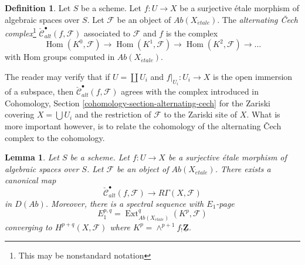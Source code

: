 \documentclass{stacks-project}
\theoremstyle{plain}
\newtheorem{lemma}[subsection]{Lemma}
\theoremstyle{definition}
\newtheorem{definition}[subsection]{Definition}
\theoremstyle{remark}
\numberwithin{equation}{subsection}
\def\Hom{\mathop{\mathrm{Hom}}\nolimits}
\def\Ext{\mathop{\mathrm{Ext}}\nolimits}
\def\etale{{\acute{e}tale}}
\begin{document}
\begin{definition}
\label{definition-alternating-cech-complex}
Let $S$ be a scheme. Let $f : U \to X$ be a surjective \'etale morphism
of algebraic spaces over $S$. Let $\mathcal{F}$ be an object of
$\textit{Ab}(X_\etale)$. The
{\it alternating {\v C}ech complex}\footnote{This may be nonstandard notation}
$\check{\mathcal{C}}^\bullet_{alt}(f, \mathcal{F})$
associated to $\mathcal{F}$ and $f$ is the complex
$$
\Hom(K^0, \mathcal{F}) \to \Hom(K^1, \mathcal{F}) \to
\Hom(K^2, \mathcal{F}) \to \ldots
$$
with Hom groups computed in $\textit{Ab}(X_\etale)$.
\end{definition}

\noindent
The reader may verify that if $U = \coprod U_i$ and $f|_{U_i} : U_i \to X$
is the open immersion of a subspace, then
$\check{\mathcal{C}}_{alt}^\bullet(f, \mathcal{F})$ agrees with the complex
introduced in
Cohomology, Section \ref{cohomology-section-alternating-cech}
for the Zariski covering $X = \bigcup U_i$ and the restriction
of $\mathcal{F}$ to the Zariski site of $X$. What is more important
however, is to relate the cohomology of the alternating
{\v C}ech complex to the cohomology.

\begin{lemma}
\label{lemma-alternating-cech-to-cohomology}
Let $S$ be a scheme. Let $f : U \to X$ be a surjective \'etale morphism
of algebraic spaces over $S$. Let $\mathcal{F}$ be an object of
$\textit{Ab}(X_\etale)$. There exists a canonical map
$$
\check{\mathcal{C}}^\bullet_{alt}(f, \mathcal{F})
\longrightarrow
R\Gamma(X, \mathcal{F})
$$
in $D(\textit{Ab})$. Moreover, there is a spectral sequence with $E_1$-page
$$
E_1^{p, q} =
\Ext_{\textit{Ab}(X_\etale)}^q(K^p, \mathcal{F})
$$
converging to $H^{p + q}(X, \mathcal{F})$ where
$K^p = \wedge^{p + 1}f_!\underline{\mathbf{Z}}$.
\end{lemma}
\end{document}
